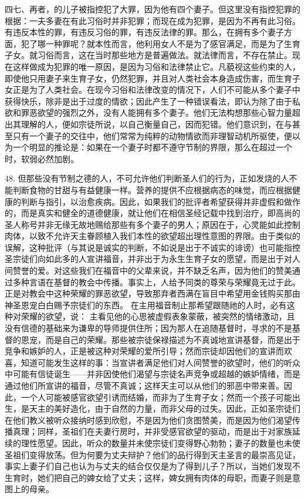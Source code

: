 四七、再者，的儿子被指控犯了大罪，因为他有四个妻子。但这里没有指控犯罪的根据：一夫多妻在有此习俗时并非犯罪；而现在成为犯罪，是因为不再有此习俗。有违反本性的罪，有违反习俗的罪，有违反法律的罪。那么，在拥有多个妻子方面，犯了哪一种罪呢？就本性而言，他利用女人不是为了感官满足，而是为了生育子女。就习俗而言，这在当时那些地方是普遍做法。就法律而言，不存在禁止。现在这样做成为犯罪的唯一原因，是因为习俗和法律禁止它。凡藐视这些约束的人，即使他只用妻子来生育子女，仍然犯罪，并且对人类社会本身造成伤害，而生育子女正是为了人类社会。在现今习俗和法律改变的情况下，人们不可能从多个妻子中获得快乐，除非是出于过度的情欲；因此产生了一种错误看法，即认为除了由于私欲和罪恶欲望的强烈之外，没有人能拥有多个妻子。他们无法构想那些心智力量超出其理解的人，便如宗徒所说，以自己衡量自己，因而犯错。他们意识到，在与甚至只有一个妻子的交往中，他们常常为纯粹的动物情欲而非理智动机所驱使，便以为一个明显的推论是：如果在一个妻子时都不遵守节制的界限，那么在超过一个时，软弱必然加剧。\par

48. 但那些没有节制之德的人，不可允许他们判断圣人们的行为，正如发烧的人不能判断食物的甘甜与有益健康一样。营养的提供不应根据病态的味觉，而应根据健康的判断与指引，以治愈疾病。因此，如果我们的批评者希望获得并非虚假和做作的，而是真实和健全的道德健康，就让他们在相信圣经记载中找到治疗，即高尚的圣人称号并非无缘无故地赐给那些有多个妻子的男人；原因在于，心灵能如此控制肉体，以致不允许天主眷顾植入我们本性的欲望超出理性意图的界限。由于类似的误解，这种批评（与其说是诚实的判断，不如说是出于不诚实的诽谤）也可能指控圣宗徒们向如此多的人宣讲福音，并非出于为永生生育子女的愿望，而是出于对人间赞誉的爱。对这些我们在福音中的父辈来说，并不缺乏名声，因为他们的赞美通过多种言语在基督的教会中传播。事实上，人给予同类的尊荣与荣耀竟无过于此。正是对教会中这种荣耀的罪恶欲望，导致那弃者西满在盲目中希望用金钱购买那由神圣恩宠白白赐予宗徒们的东西。 在主用福音制止那希望跟随祂的人时，必有这种对荣耀的欲望，说： 主看见他的心思被虚假表象蒙蔽，被突然的情绪激动，且没有信德的基础来为谦卑的导师提供住所；因为那人在追随基督时，寻求的不是基督的恩宠，而是自己的荣耀。那些被宗徒保禄描述为不真诚地宣讲基督，而是出于竞争和嫉妒的人，正是被这种对荣耀的爱所引导；然而宗徒却因他们的宣讲而欢喜，知道可能发生这样的事：当宣讲者满足他们对人间赞誉的欲望时，他们的听众中可能有信徒诞生——并非因使他们渴望与宗徒名声竞争或超越的嫉妒情绪，而是通过他们所宣讲的福音，尽管不真诚；这样天主可以从他们的邪恶中带来善。因此，一个人可能被感官欲望引诱而结婚，而非为了生育子女；然而一个孩子可能出生，是天主的美好造化，由于自然的力量，而非父母的过失。因此，正如圣宗徒们在他们教义被听众接纳时感到欣慰，不是因为他们贪图赞美，而是因为他们渴望传播真理；同样，圣祖们在夫妻行房时，并非受感官欲望的驱动，而是出于对家族延续的理性愿望。因此，听众的数量并未使宗徒们变得野心勃勃；妻子的数量也未使圣祖们变得放荡。但为何要为丈夫辩护？他们的品行得到天主圣言的最崇高见证，事实上妻子们自己也认为与丈夫的结合仅仅是为了得到儿子？所以，当她们发现不生育时，她们把自己的婢女给了丈夫；这样，婢女拥有肉体的母职，而妻子则是意图上的母亲。\par

